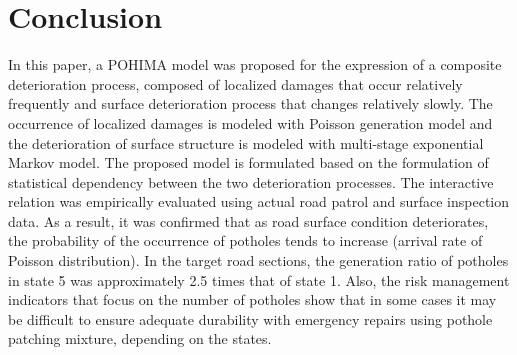 \documentclass[Journal]{ascelike}
\begin{document}
\section{Conclusion}\label{conclusion}
In this paper, a POHIMA model was proposed for the expression of a composite deterioration process, composed of localized damages that occur relatively frequently and surface deterioration process that changes relatively slowly. The occurrence of localized damages is modeled with Poisson generation model and the deterioration of surface structure is modeled with multi-stage exponential Markov model. The proposed model is formulated based on the formulation of statistical dependency between the two deterioration processes. The interactive relation was empirically evaluated using actual road patrol and surface inspection data. As a result, it was confirmed that as road surface condition deteriorates, the probability of the occurrence of potholes tends to increase (arrival rate of Poisson distribution). In the target road sections, the generation ratio of potholes in state 5 was approximately 2.5 times that of state 1. Also, the risk management indicators that focus on the number of potholes show that in some cases it may be difficult to ensure adequate durability with emergency repairs using pothole patching mixture, depending on the states.
%
%
%


\end{document}
